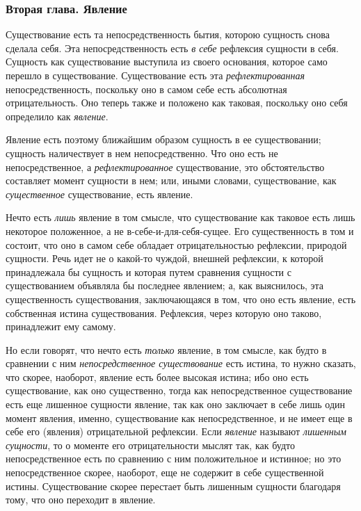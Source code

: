 \subsubsection{Вторая глава. Явление}
Существование есть та непосредственность бытия,
которою сущность снова сделала себя. Эта непосредственность есть
{\em в себе} рефлексия сущности в себя. Сущность как
существование выступила из своего основания, которое само перешло в
существование. Существование есть эта
{\em рефлектированная} непосредственность, поскольку
оно в самом себе есть абсолютная отрицательность. Оно теперь также и
положено как таковая, поскольку оно себя определило как
{\em явление}.

Явление есть поэтому ближайшим образом сущность в ее существовании; сущность
наличествует в нем непосредственно. Что оно есть не непосредственное, а
{\em рефлектированное} существование, это
обстоятельство составляет момент сущности в нем; или, иными словами,
существование, как {\em существенное} существование,
есть явление.

Нечто есть {\em лишь} явление в том смысле, что
существование как таковое есть лишь некоторое положенное, а не
в-себе-и-для-себя-сущее. Его существенность в том и состоит, что оно в
самом себе обладает отрицательностью рефлексии, природой сущности. Речь
идет не о какой-то чуждой, внешней рефлексии, к которой принадлежала бы
сущность и которая путем сравнения сущности с существованием объявляла бы
последнее явлением; а, как выяснилось, эта существенность существования,
заключающаяся в том, что оно есть явление, есть собственная истина
существования. Рефлексия, через которую оно таково, принадлежит ему самому.

Но если говорят, что нечто есть {\em только} явление, в
том смысле, как будто в сравнении с ним
{\em непосредственное существование} есть истина, то
нужно сказать, что скорее, наоборот, явление есть более высокая истина; ибо
оно есть существование, как оно существенно, тогда как непосредственное
существование есть еще лишенное сущности явление, так как оно заключает в
себе лишь один момент явления, именно, существование как непосредственное,
и не имеет еще в себе его (явления) отрицательной рефлексии. Если
{\em явление} называют
{\em лишенным сущности}, то о моменте его
отрицательности мыслят так, как будто непосредственное есть по сравнению с
ним положительное и истинное; но это непосредственное скорее, наоборот, еще
не содержит в себе существенной истины. Существование скорее перестает быть
лишенным сущности благодаря тому, что оно переходит в явление.

